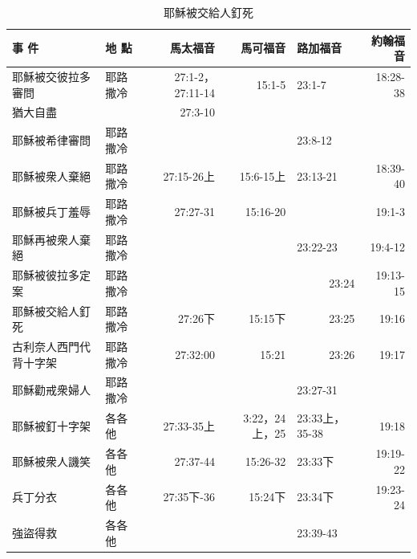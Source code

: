 \begin{table}[htbp]
  \centering
 
    \begin{tabular}{|p{13.5em}|p{4.055em}|r|r|p{4.055em}|r|}
    \toprule
    事 件   & 地 點   & \multicolumn{1}{p{4.055em}|}{馬太福音} & \multicolumn{1}{p{4.055em}|}{馬可福音} & 路加福音  & \multicolumn{1}{p{4.055em}|}{約翰福音} \\
    \midrule
    耶穌被交彼拉多審問 & 耶路撒冷  & \multicolumn{1}{p{4.055em}|}{27:1-2，27:11-14} & \multicolumn{1}{p{4.055em}|}{15:1-5} & 23:1-7 & \multicolumn{1}{p{4.055em}|}{18:28-38} \\
    \midrule
    猶大自盡  & \multicolumn{1}{r|}{} & \multicolumn{1}{p{4.055em}|}{27:3-10} &       & \multicolumn{1}{r|}{} &  \\
    \midrule
    耶穌被希律審問 & 耶路撒冷  &       &       & 23:8-12 &  \\
    \midrule
    耶穌被衆人棄絕 & 耶路撒冷  & \multicolumn{1}{p{4.055em}|}{27:15-26上} & \multicolumn{1}{p{4.055em}|}{15:6-15上} & 23:13-21 & \multicolumn{1}{p{4.055em}|}{18:39-40} \\
    \midrule
    耶穌被兵丁羞辱 & 耶路撒冷  & \multicolumn{1}{p{4.055em}|}{27:27-31} & \multicolumn{1}{p{4.055em}|}{15:16-20} & \multicolumn{1}{r|}{} & \multicolumn{1}{p{4.055em}|}{19:1-3} \\
    \midrule
    耶穌再被衆人棄絕 & 耶路撒冷  &       &       & 23:22-23 & \multicolumn{1}{p{4.055em}|}{19:4-12} \\
    \midrule
    耶穌被彼拉多定案 & 耶路撒冷  &       &       & \multicolumn{1}{r|}{23:24} & \multicolumn{1}{p{4.055em}|}{19:13-15} \\
    \midrule
    耶穌被交給人釘死 & 耶路撒冷  & \multicolumn{1}{p{4.055em}|}{27:26下} & \multicolumn{1}{p{4.055em}|}{15:15下} & \multicolumn{1}{r|}{23:25} & 19:16 \\
    \midrule
    古利奈人西門代背十字架 & 耶路撒冷  & 27:32:00 & 15:21 & \multicolumn{1}{r|}{23:26} & 19:17 \\
    \midrule
    耶穌勸戒衆婦人 & 耶路撒冷  &       &       & 23:27-31 &  \\
    \midrule
    耶穌被釘十字架 & 各各他   & \multicolumn{1}{p{4.055em}|}{27:33-35上} & \multicolumn{1}{p{4.055em}|}{3:22，24上，25} & 23:33上，35-38 & 19:18 \\
    \midrule
    耶穌被衆人譏笑 & 各各他   & \multicolumn{1}{p{4.055em}|}{27:37-44} & \multicolumn{1}{p{4.055em}|}{15:26-32} & 23:33下 & \multicolumn{1}{p{4.055em}|}{19:19-22} \\
    \midrule
    兵丁分衣  & 各各他   & \multicolumn{1}{p{4.055em}|}{27:35下-36} & \multicolumn{1}{p{4.055em}|}{15:24下} & 23:34下 & \multicolumn{1}{p{4.055em}|}{19:23-24} \\
    \midrule
    強盜得救  & 各各他   &       &       & 23:39-43 &  \\
    \bottomrule
    \end{tabular}%
     \caption{耶穌被交給人釘死}
  \label{tab:addlabel}%
\end{table}

